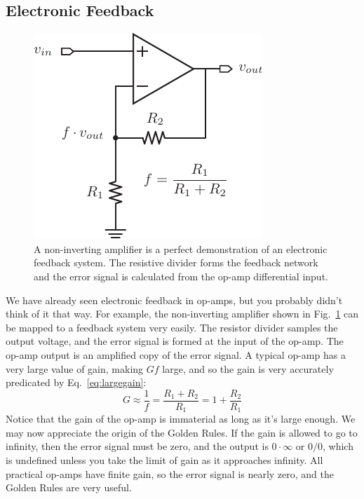 \subsection{Electronic Feedback}
\begin{figure}[tb]
\begin{center}
\includegraphics[scale=1]{opamp_fb}
\end{center}
\caption{A non-inverting amplifier is a perfect demonstration of an electronic feedback system.  The resistive divider forms the feedback network and the error signal is calculated from the op-amp differential input.}
\label{fig:opamp_fb}
\end{figure}

We have already seen electronic feedback in op-amps, but you probably didn't think of it that way.  For example, the non-inverting amplifier shown in Fig.~\ref{fig:opamp_fb} can be mapped to a feedback system very easily.  The resistor divider samples the output voltage, and the error signal is formed at the input of the op-amp.  The op-amp output is an amplified copy of the error signal.  A typical op-amp has a very large value of gain, making $G f$ large, and so the gain is very accurately predicated by Eq.~\ref{eq:largegain}:
\begin{equation}
	G \approx \frac{1}{f} = \frac{R_1 + R_2}{R_1} = 1 + \frac{R_2}{R_1}
\end{equation}
Notice that the gain of the op-amp is immaterial as long as it's large enough.  We may now appreciate the origin of the Golden Rules.  If the gain is allowed to go to infinity, then the error signal must be zero, and the output is $0 \cdot \infty$ or $0/0$, which is undefined unless you take the limit of gain as it approaches infinity.  All practical op-amps have finite gain, so the error signal is nearly zero, and the Golden Rules are very useful.  
